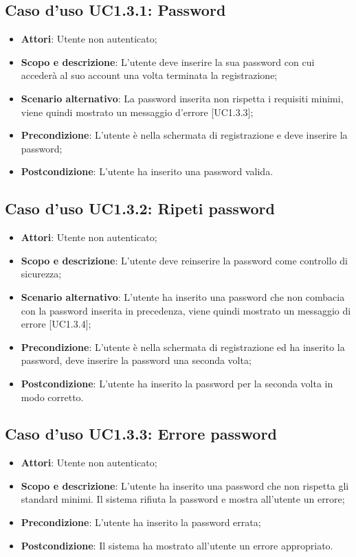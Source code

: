 \documentclass[12pt,a4paper,titlepage]{article}
\begin{document}
	\subsection{Caso d'uso UC1.3.1: Password}
	\label{UC1.3.1}
	\begin{itemize}
		\item \textbf{Attori}: Utente non autenticato;
		\item \textbf{Scopo e descrizione}: L'utente deve inserire la sua password con cui accederà al suo account una volta terminata la registrazione;
		\item \textbf{Scenario alternativo}: La password inserita non rispetta i requisiti minimi, viene quindi mostrato un messaggio d'errore [UC1.3.3];
		\item \textbf{Precondizione}: L'utente è nella schermata di registrazione e deve inserire la password;
		\item \textbf{Postcondizione}: L'utente ha inserito una password valida.
	\end{itemize}
	\subsection{Caso d'uso UC1.3.2: Ripeti password}
	\label{UC1.3.2}
	\begin{itemize}
		\item \textbf{Attori}: Utente non autenticato;
		\item \textbf{Scopo e descrizione}: L'utente deve reinserire la password come controllo di sicurezza;
		\item \textbf{Scenario alternativo}: L'utente ha inserito una password che non combacia con la password inserita in precedenza, viene quindi mostrato un messaggio di errore [UC1.3.4];
		\item \textbf{Precondizione}: L'utente è nella schermata di registrazione ed ha inserito la password, deve inserire la password una seconda volta;
		\item \textbf{Postcondizione}: L'utente ha inserito la password per la seconda volta in modo corretto.
	\end{itemize}
	\subsection{Caso d'uso UC1.3.3: Errore password}
	\label{UC1.3.3}
	\begin{itemize}
		\item \textbf{Attori}: Utente non autenticato;
		\item \textbf{Scopo e descrizione}: L'utente ha inserito una password che non rispetta gli standard minimi. Il sistema rifiuta la password e mostra all'utente un errore;
		\item \textbf{Precondizione}: L'utente ha inserito la password errata;
		\item \textbf{Postcondizione}: Il sistema ha mostrato all'utente un errore appropriato.
	\end{itemize}
\end{document}
